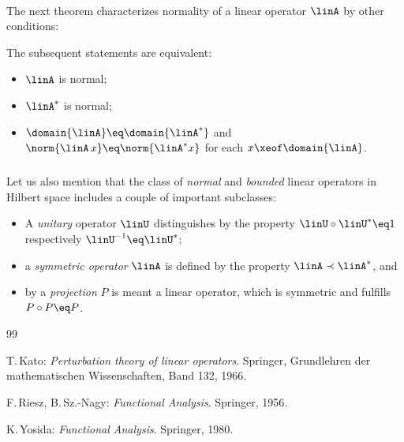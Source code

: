 \documentclass[11pt,twoside]{article}
\begin{document}
\paragraph{} %
The next theorem characterizes normality of a linear operator $\linA$
by other conditions:

\begin{theorem1}
The subsequent statements are equivalent:

\begin{itemize}[leftmargin=30pt]
\item[(a)] $\linA$ is normal;
\item[(b)] $\linA^*$ is normal;
\item[(c)] $\domain{\linA} \eq \domain{\linA^*}$ and
           $\norm{\linA \,x} \eq \norm{\linA^* x}$
           for each $x \xeof \domain{\linA}$.
\end{itemize}
\end{theorem1}

\subparagraph{}
Let us also mention that
the class of \textit{normal} and \textit{bounded} linear operators
in Hilbert space includes a couple of important subclasses:

\begin{itemize}[leftmargin=12pt]
\item[1.] 
A \textit{unitary} operator $\linU$ distinguishes 
by the property $\linU \circ \linU^* \eq 1$ respectively
$\linU^{-1} \eq \linU^*$;
\item[2.] 
a \textit{symmetric operator} $\linA$ is defined by the property
$\linA \prec \linA^*$,
and
\item[3.] 
by a \textit{projection} $P$ is meant a linear operator,
which is symmetric and fulfills $P \circ P \eq P$.
\end{itemize}

\vspace{5mm}
\begin{thebibliography}{99}
\begin{small}

 T.\,Kato:
\textit{{Perturbation theory of linear operators}}.
Springer, Grund\-lehren der mathematischen Wissenschaften, Band 132, 1966.

 F.\,Riesz, B.\,Sz.-Nagy:
\textit{{Functional Analysis}}.
Springer, 1956.

 K.\,Yosida:
\textit{Functional Analysis}.
Springer, 1980.

\end{small}
\end{thebibliography}
\end{document}
